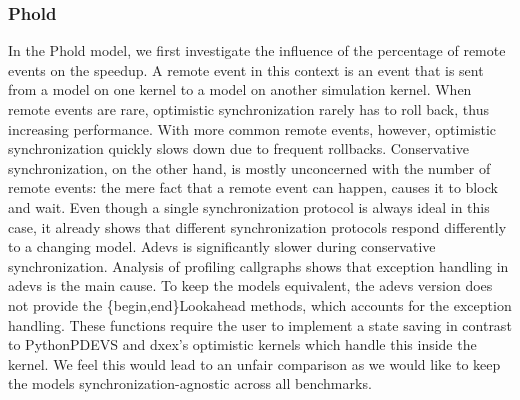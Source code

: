 \subsubsection{Phold}
In the Phold model, we first investigate the influence of the percentage of remote events on the speedup. A remote event in this context is an event that is sent from a model on one kernel to a model on another simulation kernel.
When remote events are rare, optimistic synchronization rarely has to roll back, thus increasing performance.
With more common remote events, however, optimistic synchronization quickly slows down due to frequent rollbacks.
Conservative synchronization, on the other hand, is mostly unconcerned with the number of remote events: the mere fact that a remote event can happen, causes it to block and wait.
Even though a single synchronization protocol is always ideal in this case, it already shows that different synchronization protocols respond differently to a changing model.
Adevs is significantly slower during conservative synchronization.
Analysis of profiling callgraphs shows that exception handling in adevs is the main cause. 
To keep the models equivalent, the adevs version does not provide the \{begin,end\}Lookahead methods, which accounts for the exception handling. These functions require the user to implement a state saving in contrast to PythonPDEVS and dxex's optimistic kernels which handle this inside the kernel. We feel this would lead to an unfair comparison as we would like to keep the models synchronization-agnostic across all benchmarks.

